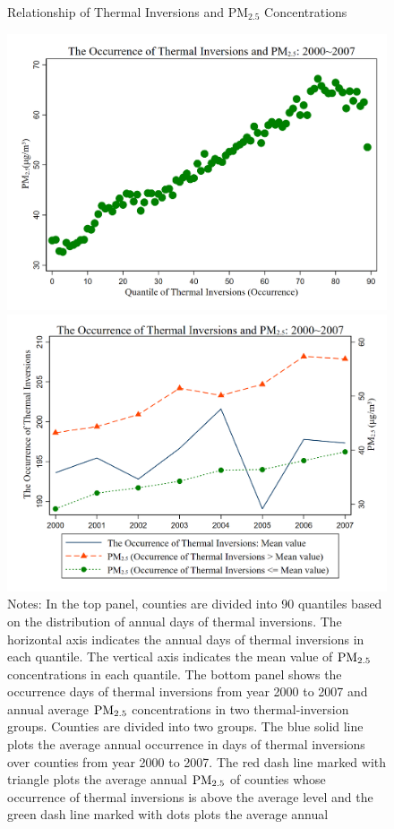 \documentclass[12pt]{article}
\begin{document}
\newpage
 \thispagestyle{empty} 
  \begin{figure}[H]
    \caption{Relationship of Thermal Inversions and $\mathrm{PM_{2.5}}$ Concentrations}\label{fig:3}
    \centering
    \begin{minipage}[b]{0.75\textwidth}
      \includegraphics[width=\textwidth]{images_updated/TI_PM2.5_corr.png}
    \end{minipage}
    \centering
    \begin{minipage}[b]{0.75\textwidth}
      \includegraphics[width=\textwidth]{images_updated/TI_PM25_2.png}
    \end{minipage}
    \small
    \caption*{Notes: In the top panel, counties are divided into 90 quantiles based on the distribution of annual days of thermal inversions. The horizontal axis indicates the annual days of thermal inversions in each quantile. The vertical axis indicates the mean value of $\rm PM_{2.5}$ concentrations in each quantile. The bottom panel shows the occurrence days of thermal inversions from year 2000 to 2007 and annual average $\rm PM_{2.5}$ concentrations in two thermal-inversion groups. Counties are divided into two groups. The blue solid line plots the average annual occurrence in days of thermal inversions over counties from year 2000 to 2007. The red dash line marked with triangle plots the average annual $\rm PM_{2.5}$ of counties whose occurrence of thermal inversions is above the average level and the green dash line marked with dots plots the average annual
}
\end{figure}
\end{document}
